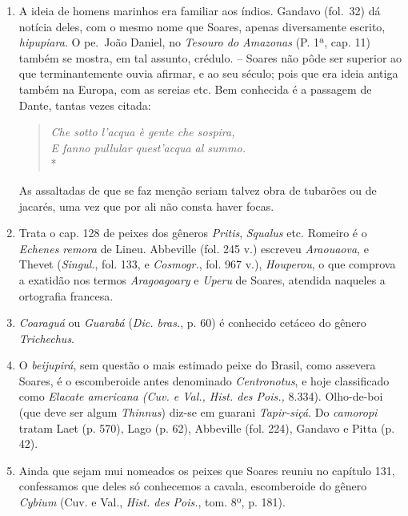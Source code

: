 \begin{enumerate}
\item A ideia de homens marinhos era familiar aos índios. Gandavo (fol.~32) dá notícia 
deles, com o mesmo nome que Soares, apenas diversamente escrito, \textit{hipupiara}. O 
pe.~João Daniel, no \textit{Tesouro do Amazonas} (P. 1ª, cap. 11) também se mostra, em tal 
assunto, crédulo. -- Soares não pôde ser superior ao que terminantemente ouvia 
afirmar, e ao seu século; pois que era ideia antiga também na Europa, com as sereias 
etc. Bem conhecida é a passagem de Dante, tantas vezes citada: 
\begin{verse}
\textit{Che sotto l'acqua è gente che sospira,\\ 
E fanno pullular quest'acqua al summo.} \\*
\end{verse}
As assaltadas de que se faz menção seriam talvez obra de tubarões ou de jacarés, uma 
vez que por ali não consta haver focas.

\item Trata o cap. 128 de peixes dos gêneros \textit{Pritis}, \textit{Squalus} etc. Romeiro é o \textit{Echenes 
remora} de Lineu. Abbeville (fol. 245 v.) escreveu \textit{Araouaova}, e Thevet (\textit{Singul.}, fol. 
133, e  \textit{Cosmogr.}, fol. 967 v.), \textit{Houperou}, o que comprova a exatidão nos termos \textit{Aragoagoary} 
e \textit{Uperu} de Soares, atendida naqueles a ortografia francesa.

\item \textit{Coaraguá} ou \textit{Guarabá} (\textit{Dic. bras.}, p. 60) é conhecido cetáceo do gênero  \textit{Trichechus}.

\item O \textit{beijupirá}, sem questão o mais estimado peixe do Brasil, como assevera Soares, 
é o escomberoide antes denominado \textit{Centronotus}, e hoje classificado como 
\textit{Elacate americana (Cuv. e Val., Hist. des Pois.,} 8.334).
Olho-de-boi (que deve ser algum \textit{Thinnus}) diz-se em guarani \textit{Tapir-siçá}. Do \textit{camoropi} 
tratam Laet (p. 570), Lago (p. 62), Abbeville (fol. 224), Gandavo e Pitta (p. 42).

\item  Ainda que sejam mui nomeados os peixes que Soares reuniu no
capítulo 131, confessamos que deles só conhecemos a cavala, escomberoide
do gênero \textit{Cybium} (Cuv. e Val., \textit{Hist. des Pois.}, tom. 8º, p. 181).


\end{enumerate}
